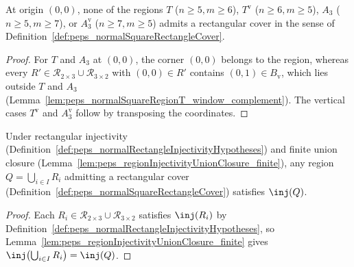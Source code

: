 \begin{lemma}%
    \label{lem:peps_normalSquareRegionT_no_five_by_six_cover}
    \leanok
    At origin $(0,0)$, none of the regions $T$ ($n\ge 5,m\ge 6$),
    $T^{\mathrm v}$ ($n\ge 6,m\ge 5$), $A_3$ ($n\ge 5,m\ge 7$), or
    $A_3^{\mathrm v}$ ($n\ge 7,m\ge 5$) admits a rectangular cover in the sense
    of Definition~\ref{def:peps_normalSquareRectangleCover}.
\end{lemma}
\begin{proof}\leanok
    For $T$ and $A_3$ at $(0,0)$, the corner $(0,0)$ belongs to the region,
    whereas every $R'\in\mathcal R_{2\times 3}\cup\mathcal R_{3\times 2}$ with
    $(0,0)\in R'$ contains $(0,1)\in B_{\mathrm v}$, which lies outside $T$ and
    $A_3$ (Lemma~\ref{lem:peps_normalSquareRegionT_window_complement}). The
    vertical cases $T^{\mathrm v}$ and $A_3^{\mathrm v}$ follow by transposing
    the coordinates.
\end{proof}

\begin{lemma}%
    \label{lem:peps_normalSquareRectangleCover_injective}
    \leanok
    Under rectangular injectivity
    (Definition~\ref{def:peps_normalRectangleInjectivityHypotheses}) and finite
    union closure (Lemma~\ref{lem:peps_regionInjectivityUnionClosure_finite}),
    any region $Q=\bigcup_{i\in I}R_i$ admitting a rectangular cover
    (Definition~\ref{def:peps_normalSquareRectangleCover}) satisfies $\inj(Q)$.
\end{lemma}
\begin{proof}\leanok
    Each $R_i\in\mathcal R_{2\times 3}\cup\mathcal R_{3\times 2}$ satisfies
    $\inj(R_i)$ by
    Definition~\ref{def:peps_normalRectangleInjectivityHypotheses}, so
    Lemma~\ref{lem:peps_regionInjectivityUnionClosure_finite} gives
    $\inj\bigl(\bigcup_{i\in I}R_i\bigr)=\inj(Q)$.
\end{proof}

